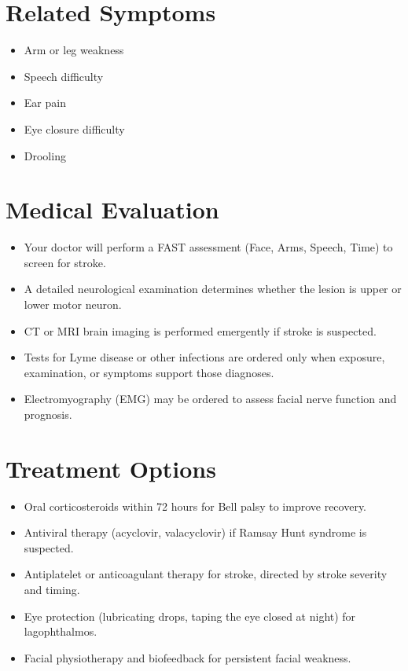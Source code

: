 \section*{Related Symptoms}
\begin{itemize}
  \item Arm or leg weakness
  \item Speech difficulty
  \item Ear pain
  \item Eye closure difficulty
  \item Drooling
\end{itemize}

\section*{Medical Evaluation}
\begin{itemize}
  \item Your doctor will perform a FAST assessment (Face, Arms, Speech, Time) to screen for stroke.
  \item A detailed neurological examination determines whether the lesion is upper or lower motor neuron.
  \item CT or MRI brain imaging is performed emergently if stroke is suspected.
  \item Tests for Lyme disease or other infections are ordered only when exposure, examination, or symptoms support those diagnoses.
  \item Electromyography (EMG) may be ordered to assess facial nerve function and prognosis.
\end{itemize}

\section*{Treatment Options}
\begin{itemize}
  \item Oral corticosteroids within 72 hours for Bell palsy to improve recovery.
  \item Antiviral therapy (acyclovir, valacyclovir) if Ramsay Hunt syndrome is suspected.
  \item Antiplatelet or anticoagulant therapy for stroke, directed by stroke severity and timing.
  \item Eye protection (lubricating drops, taping the eye closed at night) for lagophthalmos.
  \item Facial physiotherapy and biofeedback for persistent facial weakness.
\end{itemize}


